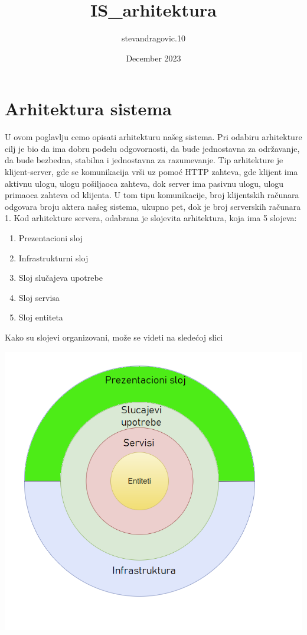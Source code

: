 \documentclass{article}
\title{IS_arhitektura}
\author{stevandragovic.10 }
\date{December 2023}
\begin{document}
\section{Arhitektura sistema}

U ovom poglavlju cemo opisati arhitekturu našeg sistema. Pri odabiru arhitekture cilj je bio da ima dobru podelu odgovornosti, da bude jednostavna za održavanje, da bude bezbedna, stabilna i jednostavna za razumevanje. Tip arhitekture je klijent-server, gde se komunikacija vrši uz pomoć HTTP zahteva, gde klijent ima aktivnu ulogu, ulogu pošiljaoca zahteva, dok server ima pasivnu ulogu, ulogu primaoca zahteva od klijenta. U tom tipu komunikacije, broj klijentskih računara odgovara broju aktera našeg sistema, ukupno pet, dok je broj serverskih računara 1.
\newline
\newline
\newline
Kod arhitekture servera, odabrana je slojevita arhitektura, koja ima 5 slojeva:
\begin{enumerate}
    \item Prezentacioni sloj
    \item Infrastrukturni sloj
    \item Sloj slučajeva upotrebe 
    \item Sloj servisa
    \item Sloj entiteta
\end{enumerate}
Kako su slojevi organizovani, može se videti na sledećoj slici 

\begin{center}
    \includegraphics[scale=0.5]{arhitekturaSistema.png}
\end{center}
\end{document}
